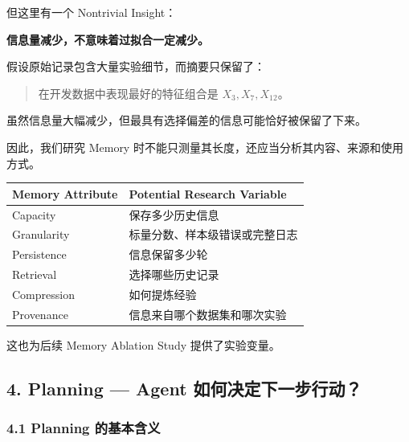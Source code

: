 但这里有一个 Nontrivial Insight：

\textbf{信息量减少，不意味着过拟合一定减少。}

假设原始记录包含大量实验细节，而摘要只保留了：

\begin{quote}
在开发数据中表现最好的特征组合是 \(X_3,X_7,X_{12}\)。
\end{quote}

虽然信息量大幅减少，但最具有选择偏差的信息可能恰好被保留了下来。

因此，我们研究 Memory 时不能只测量其长度，还应当分析其内容、来源和使用方式。

\begin{readertable}
\begin{longtable}[]{@{}
  >{\raggedright\arraybackslash}p{}
  >{\raggedright\arraybackslash}p{}@{}}
\toprule
Memory Attribute & Potential Research Variable \\
\midrule
\endhead
Capacity & 保存多少历史信息 \\
Granularity & 标量分数、样本级错误或完整日志 \\
Persistence & 信息保留多少轮 \\
Retrieval & 选择哪些历史记录 \\
Compression & 如何提炼经验 \\
Provenance & 信息来自哪个数据集和哪次实验 \\
\bottomrule
\end{longtable}
\end{readertable}

这也为后续 Memory Ablation Study 提供了实验变量。

\hypertarget{part-3-34-0001-planning-agent-ux5982ux4f55ux51b3ux5b9aux4e0bux4e00ux6b65ux884cux52a8}{%
\subsection{4. Planning --- Agent 如何决定下一步行动？}\label{part-3-34-0001-planning-agent-ux5982ux4f55ux51b3ux5b9aux4e0bux4e00ux6b65ux884cux52a8}}

\hypertarget{part-3-34-0001-planning-ux7684ux57faux672cux542bux4e49}{%
\subsubsection{4.1 Planning 的基本含义}\label{part-3-34-0001-planning-ux7684ux57faux672cux542bux4e49}}

